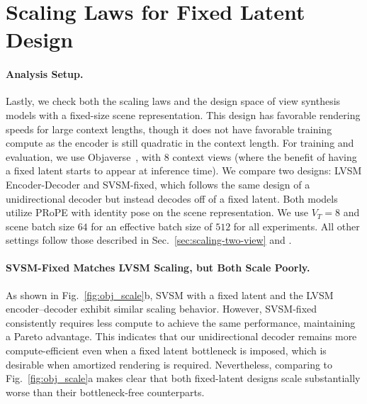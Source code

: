 \section{Scaling Laws for Fixed Latent Design}


\paragraph{Analysis Setup.} Lastly, we check both the scaling laws and the design space of view synthesis models with a fixed-size scene representation. This design has favorable rendering speeds for large context lengths, though it does not have favorable training compute as the encoder is still quadratic in the context length. For training and evaluation, we use Objaverse~\citep{objaverse}, with 8 context views (where the benefit of having a fixed latent starts to appear at inference time). We compare two designs: LVSM Encoder-Decoder and SVSM-fixed, which follows the same design of a unidirectional decoder but instead decodes off of a fixed latent. Both models utilize PRoPE with identity pose on the scene representation. We use $V_T = 8$ and scene batch size $64$ for an effective batch size of $512$ for all experiments. All other settings follow those described in Sec.~\ref{sec:scaling-two-view} and .

\paragraph{SVSM-Fixed Matches LVSM Scaling, but Both Scale Poorly.} As shown in Fig.~\ref{fig:obj_scale}b, SVSM with a fixed latent and the LVSM encoder–decoder exhibit similar scaling behavior. However, SVSM-fixed consistently requires less compute to achieve the same performance, maintaining a Pareto advantage. This indicates that our unidirectional decoder remains more compute-efficient even when a fixed latent bottleneck is imposed, which is desirable when amortized rendering is required. Nevertheless, comparing to Fig.~\ref{fig:obj_scale}a makes clear that both fixed-latent designs scale substantially worse than their bottleneck-free counterparts.